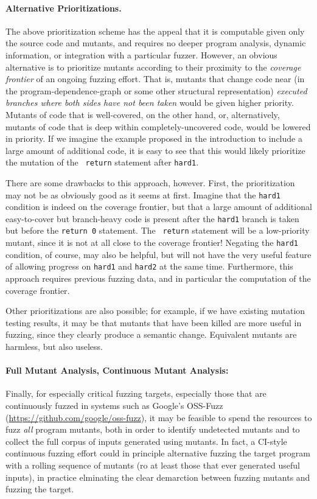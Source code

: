 \paragraph{Alternative Prioritizations.}  The above prioritization scheme has the
appeal that it is computable given only the source code and mutants,
and requires no deeper program analysis, dynamic information, or
integration with a particular fuzzer.  However, an obvious alternative
is to prioritize mutants according to their proximity to the
\emph{coverage frontier} of an ongoing fuzzing effort.  That is,
mutants that change code near (in the program-dependence-graph or some other structural representation)  \emph{executed branches where both sides have not been taken} would be given higher
priority.  Mutants of code that is well-covered, on the other hand, or, alternatively, mutants of
code that is deep within completely-uncovered code,
would be lowered in priority.  If we imagine the example proposed in the
introduction to include a large amount of additional code, it is easy
to see that this would likely prioritize the mutation of the {\tt
  return} statement after {\tt hard1}.

There are some drawbacks to this approach, however.  First, the
prioritization may not be as obviously good as it seems at first.
Imagine that the {\tt hard1} condition is indeed on the coverage
frontier, but that a large amount of additional easy-to-cover but branch-heavy code  is present after
the {\tt hard1} branch is taken but before the {\tt return 0} statement.  The {\tt
  return} statement will be a low-priority mutant, since it is not at
all close to the coverage frontier!  Negating the {\tt hard1}
condition, of course, may also be helpful, but will not have the very
useful feature of allowing progress on {\tt hard1} and {\tt hard2} at
the same time.  Furthermore, this approach requires previous fuzzing
data, and in particular the computation of the coverage frontier.

Other prioritizations are also possible; for example, if we have
existing mutation testing results, it may be that mutants that have
been killed are more useful in fuzzing, since they clearly produce a
semantic change.  Equivalent mutants are harmless, but also useless.

\paragraph{Full Mutant Analysis, Continuous Mutant Analysis:} Finally, for especially critical fuzzing targets, especially those
that are continuously fuzzed in systems such as Google's OSS-Fuzz
(\url{https://github.com/google/oss-fuzz}), it may be feasible to
spend the resources to fuzz \emph{all} program mutants, both in order
to identify undetected mutants and to collect the full corpus of
inputs generated using mutants.  In fact, a CI-style continuous
fuzzing effort could in principle alternative fuzzing the target
program with a rolling sequence of mutants (ro at least those that ever generated useful
inputs), in practice elminating the clear demarction between fuzzing
mutants and fuzzing the target.

